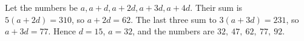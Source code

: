Let the numbers be $a,a+d,a+2d,a+3d,a+4d$. Their sum is $5(a+2d)=310$, so $a+2d=62$. The last three sum to $3(a+3d)=231$, so $a+3d=77$. Hence $d=15$, $a=32$, and the numbers are $\boxed{32,\ 47,\ 62,\ 77,\ 92}$.
